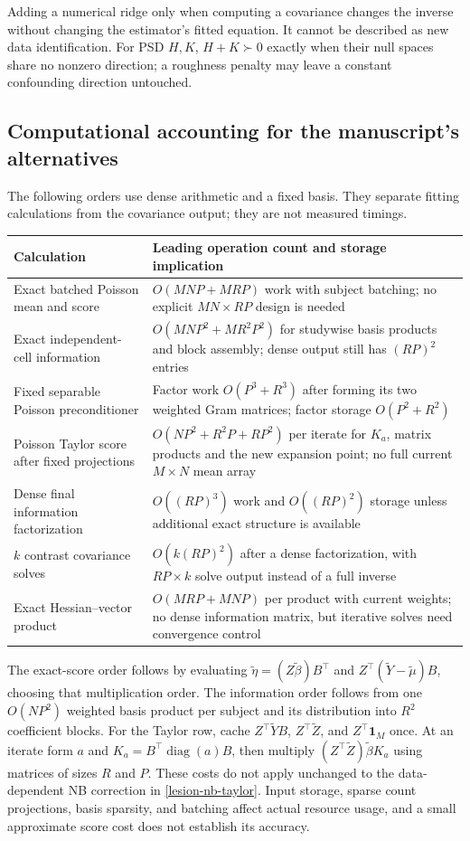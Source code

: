 \documentclass[11pt,a4paper]{article}
\newcommand{\diag}{\operatorname{diag}}
\numberwithin{equation}{section}
\begin{document}
Adding a numerical ridge only when computing a covariance changes
the inverse without changing the estimator's fitted equation.
It cannot be described as new data identification.
For PSD $H,K$, $H+K\succ0$ exactly when their null spaces share
no nonzero direction; a roughness penalty may leave a constant
confounding direction untouched.

\subsection{Computational accounting for the manuscript's alternatives}
The following orders use dense arithmetic and a fixed basis.
They separate fitting calculations from the covariance output;
they are not measured timings.
\begin{center}\small
\begin{tabularx}{\textwidth}{TT}
\toprule
Calculation & Leading operation count and storage implication\\
\midrule
Exact batched Poisson mean and score &
$O(MNP+MRP)$ work with subject batching; no explicit
$MN\times RP$ design is needed\\
Exact independent-cell information &
$O(MNP^2+MR^2P^2)$ for studywise basis products and block assembly;
dense output still has $(RP)^2$ entries\\
Fixed separable Poisson preconditioner &
Factor work $O(P^3+R^3)$ after forming its two weighted Gram matrices;
factor storage $O(P^2+R^2)$\\
Poisson Taylor score after fixed projections &
$O(NP^2+R^2P+RP^2)$ per iterate for $K_a$, matrix products and
the new expansion point; no full current $M\times N$ mean array\\
Dense final information factorization &
$O((RP)^3)$ work and $O((RP)^2)$ storage unless additional exact
structure is available\\
$k$ contrast covariance solves &
$O(k(RP)^2)$ after a dense factorization, with $RP\times k$
solve output instead of a full inverse\\
Exact Hessian--vector product &
$O(MRP+MNP)$ per product with current weights; no dense information
matrix, but iterative solves need convergence control\\
\bottomrule
\end{tabularx}
\end{center}
The exact-score order follows by evaluating
$\widetilde\eta=(Z\widetilde\beta)B^\top$ and
$Z^\top(\widetilde Y-\widetilde\mu)B$, choosing that multiplication order.
The information order follows from one $O(NP^2)$ weighted basis
product per subject and its distribution into $R^2$ coefficient blocks.
For the Taylor row, cache $Z^\top\widetilde YB$, $Z^\top \widetilde Z$,
and $Z^\top\mathbf1_M$ once.
At an iterate form $a$ and $K_a=B^\top\diag(a)B$, then multiply
$(Z^\top \widetilde Z)\widetilde\beta K_a$ using matrices of sizes $R$ and $P$.
These costs do not apply unchanged to the data-dependent
NB correction in \eqref{lesion-nb-taylor}.
Input storage, sparse count projections, basis sparsity, and batching
affect actual resource usage, and a small approximate score cost does
not establish its accuracy.
\end{document}
